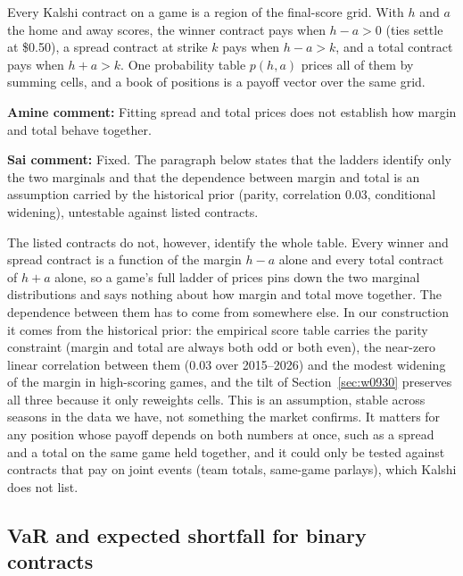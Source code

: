 Every Kalshi contract on a game is a region of the final-score grid. With $h$ and $a$ the home and away scores, the winner contract pays when $h-a>0$ (ties settle at \$0.50), a spread contract at strike $k$ pays when $h-a>k$, and a total contract pays when $h+a>k$. One probability table $p(h,a)$ prices all of them by summing cells, and a book of positions is a payoff vector over the same grid.

{\color{red}\textbf{Amine comment:} Fitting spread and total prices does not establish how margin and total behave together.}

{\color{blue}\textbf{Sai comment:} Fixed. The paragraph below states that the ladders identify only the two marginals and that the dependence between margin and total is an assumption carried by the historical prior (parity, correlation 0.03, conditional widening), untestable against listed contracts.}

The listed contracts do not, however, identify the whole table. Every winner and spread contract is a function of the margin $h-a$ alone and every total contract of $h+a$ alone, so a game's full ladder of prices pins down the two marginal distributions and says nothing about how margin and total move together. The dependence between them has to come from somewhere else. In our construction it comes from the historical prior: the empirical score table carries the parity constraint (margin and total are always both odd or both even), the near-zero linear correlation between them (0.03 over 2015--2026) and the modest widening of the margin in high-scoring games, and the tilt of Section~\ref{sec:w0930} preserves all three because it only reweights cells. This is an assumption, stable across seasons in the data we have, not something the market confirms. It matters for any position whose payoff depends on both numbers at once, such as a spread and a total on the same game held together, and it could only be tested against contracts that pay on joint events (team totals, same-game parlays), which Kalshi does not list.

\subsection{VaR and expected shortfall for binary contracts}\label{sec:binaryvar}


